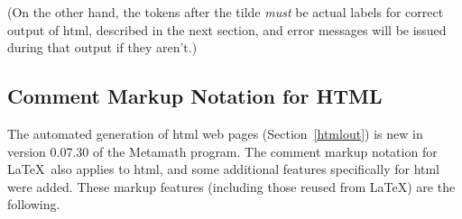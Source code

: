 (On the other hand, the tokens after the tilde {\em must} be actual
labels for correct output of {\sc html}, described in the next section,
and error messages will be issued during that output if they aren't.)

\subsection{Comment Markup Notation for HTML}\label{htmlmkup}

The automated generation of {\sc html} web pages
(Section~\ref{htmlout}) is new in version 0.07.30 of the Metamath program.
The comment markup notation for \LaTeX\ also applies to {\sc html}, and
some additional features specifically for {\sc html} were added.
These markup features (including those reused from \LaTeX) are the
following.
